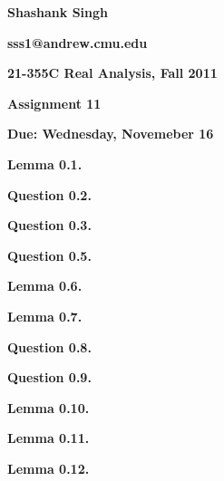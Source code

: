 \documentclass{article}
\begin{document}
\begin{center}
\textbf{Shashank Singh}

\textbf{sss1@andrew.cmu.edu}

\textbf{21-355C \quad Real Analysis, Fall 2011}

\textbf{Assignment 11}

\textbf{Due: Wednesday, Novemeber 16}
\end{center}

\textbf{Lemma 0.1.}

\textbf{Question 0.2.}

\textbf{Question 0.3.}

\textbf{Question 0.5.}

\textbf{Lemma 0.6.}

\textbf{Lemma 0.7.}

\textbf{Question 0.8.}

\textbf{Question 0.9.}

\textbf{Lemma 0.10.}

\textbf{Lemma 0.11.}

\textbf{Lemma 0.12.}
\end{document}
